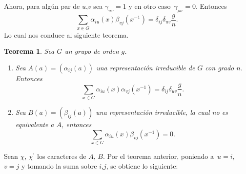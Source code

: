 \documentclass[12pt]{book}
\newtheorem{theorem}{Teorema}[section]
\theoremstyle{definition}
\newcounter{in}
\begin{document}
Ahora, para algún par de $u$,$v$ sea $\gamma_{uv}=1$ y en otro caso~$\gamma_{\rho \sigma}=0$. Entonces
\begin{equation}
  \label{eq:31}
  \sum_{x \in G} \alpha_{iu}(x) \beta_{vj}(x^{-1}) = \delta_{ij} \delta_{uv}\frac{g}{n}.
\end{equation}
Lo cual nos conduce al siguiente teorema.

\begin{theorem}
  \label{t4_3}
  Sea $G$ un grupo de orden $g$.
  \begin{enumerate}
  \item Sea $A(a)=(\alpha_{ij}(a))$ una representación irreducible de
    $G$ con grado $n$. Entonces
    \begin{equation*}
      \sum_{x \in G} \alpha_{iu}(x) \alpha_{vj}(x^{-1})
      = \delta_{ij} \delta_{uv}\frac{g}{n}.
    \end{equation*}
  \item Sea $ B(a)=(\beta_{ij}(a))$ una representación irreducible, la
    cual no es equivalente a $A$, entonces
    \begin{equation*}
      \sum_{x \in G} \alpha_{iu}(x) \beta_{vj}(x^{-1}) =0.
    \end{equation*}
    \end{enumerate}
\end{theorem}
Sean $\chi$, $\chi^{'}$ los caracteres de $A$, $B$. Por el teorema
anterior, poniendo a~$u=i$, $v=j$ y tomando la suma sobre $i$,$j$, se
obtiene lo siguiente:
\end{document}
